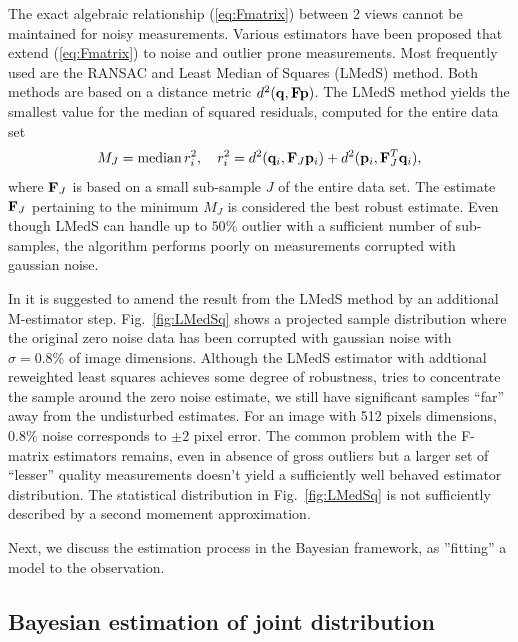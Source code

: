 \documentclass[conference]{IEEEtran}
\newcommand{\median}{\mbox{median\,}}
\newcommand{\beq}{\begin{equation}}
\newcommand{\eeq}{\end{equation}}
\begin{document}
The exact algebraic relationship (\ref{eq:Fmatrix}) between 2 views cannot be maintained for
noisy measurements. Various estimators have been proposed that extend (\ref{eq:Fmatrix}) to
noise and outlier prone measurements. Most frequently used are the RANSAC and Least Median of Squares
(LMedS) method. Both methods are based on a distance metric $d^2( {\bf q}, {\bf F}{\bf p})$. The LMedS
method yields the smallest value for the median of squared residuals, computed for the entire data set
\beq
  M_J= \median r_i^2, \quad r_i^2=d^2({\bf q}_i, {\bf F}_J {\bf p}_i) + d^2({\bf p}_i, {\bf F}_J^T{\bf q}_i),
\eeq
where ${\bf F}_J$ is based on a small sub-sample $J$ of the entire data set. The estimate ${\bf F}_J$ pertaining to
the minimum $M_J$ is considered the best robust estimate. Even though LMedS can handle up to  $50\%$ outlier with
a sufficient number of sub-samples, the algorithm performs poorly on measurements corrupted with gaussian noise.

In \cite{Zhang-96} it is suggested to amend the result from the LMedS method by an additional M-estimator step.
Fig.~\ref{fig:LMedSq} shows a projected sample distribution where the original zero noise data has been corrupted
with gaussian noise with $\sigma=0.8\%$ of image dimensions. Although the LMedS estimator with addtional reweighted
least squares achieves some degree of robustness, tries to concentrate the
sample around the zero noise estimate, we still have significant samples ``far'' away from the undisturbed
estimates. For an image with 512 pixels dimensions, $0.8\%$ noise corresponds to $\pm 2$ pixel error. The common problem
with the F-matrix estimators remains, even in absence of gross outliers but a larger set of ``lesser''  quality
measurements doesn't yield a sufficiently well behaved estimator distribution.
The statistical distribution in Fig.~\ref{fig:LMedSq} is not sufficiently described by a second momement approximation.

Next, we discuss the estimation process in the Bayesian framework, as ''fitting'' a model to the observation. 

\subsection{Bayesian estimation of joint distribution}
\end{document}
